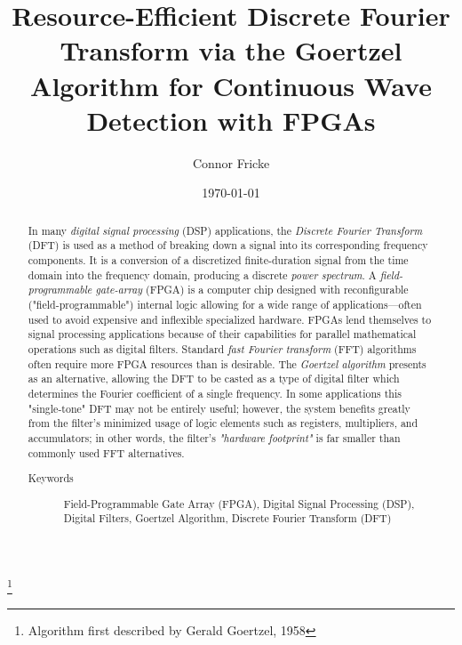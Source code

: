 \documentclass[reprint,amsmath,amssymb]{revtex4-2}
\begin{document}

\title{Resource-Efficient Discrete Fourier Transform via the Goertzel Algorithm for Continuous Wave Detection with FPGAs}
\thanks{Algorithm first described by Gerald Goertzel, 1958}%

\author{Connor Fricke}
%

 \noaffiliation

\date{\today}%

\begin{abstract}
In many \textit{digital signal processing} (DSP) applications, the \textit{Discrete Fourier Transform} (DFT) is used as a method of breaking down a signal into its corresponding frequency components. It is a conversion of a discretized finite-duration signal from the time domain into the frequency domain, producing a discrete \textit{power spectrum}. A \textit{field-programmable gate-array} (FPGA) is a computer chip designed with reconfigurable ("field-programmable") internal logic allowing for a wide range of applications---often used to avoid expensive and inflexible specialized hardware. FPGAs lend themselves to signal processing applications because of their capabilities for parallel mathematical operations such as digital filters. Standard \textit{fast Fourier transform} (FFT) algorithms often require more FPGA resources than is desirable. The \textit{Goertzel algorithm} presents as an alternative, allowing the DFT to be casted as a type of digital filter which determines the Fourier coefficient of a single frequency. In some applications this "single-tone" DFT may not be entirely useful; however, the system benefits greatly from the filter's minimized usage of logic elements such as registers, multipliers, and accumulators; in other words, the filter's \textit{"hardware footprint"} is far smaller than commonly used FFT alternatives.
\begin{description}
\item[Keywords]
Field-Programmable Gate Array (FPGA), Digital Signal Processing (DSP),\\ Digital Filters, Goertzel Algorithm, Discrete Fourier Transform (DFT)
\end{description}
\end{abstract}

\maketitle
\end{document}

